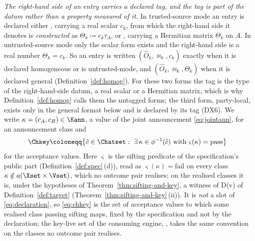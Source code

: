 \begin{definition}
\emph{The right-hand side of an entry carries a declared tag, and the tag is
part of the datum rather than a property measured of it.} In trusted-source
mode an entry is declared either , carrying a real scalar
$c_k$, from which the right-hand side it denotes is \emph{constructed} as
$\Theta_k\coloneqq c_k\tau_A$, or , carrying a Hermitian matrix
$\Theta_k$ on $A$. In untrusted-source mode only the scalar form exists and
the right-hand side is a real number $\Theta_k=c_k$. So an entry is written
$(\hat O_k,\bowtie_k,c_k)$ exactly when it is declared homogeneous or is
untrusted-mode, and $(\hat O_k,\bowtie_k,\Theta_k)$ when it is declared
general (Definition~\ref{def:homog}). For these two forms the tag
is the type of the right-hand-side datum, a real scalar or a Hermitian
matrix, which is why Definition~\ref{def:homog} calls them the untagged
forms; the third form, party-local, exists only in the general format below
and is declared by its tag (DX6). We write $\kappa=(c_A,c_B)\in\Kann$, a
value of the joint announcement \eqref{eq:jointann}, for an announcement
class and
\begin{equation}\label{eq:chkey}
  \Chkey\coloneqq\big\{\hat c\in\Chatset:\ \exists\,\kappa\in\phi^{-1}(\hat c)
  \text{ with }\varsigma(\kappa)=\mathrm{pass}\big\}
\end{equation}
for the
acceptance values. Here $\varsigma$ is the sifting predicate of the
specification's public part (Definition~\ref{def:spec}\,(d)), read as
$\varsigma(\kappa)=\mathrm{fail}$ on every class
$\kappa\notin a(\Xset\times\Vset)$, which no outcome pair realises; on the
realised classes it is, under the hypotheses of
Theorem~\ref{thm:sifting-and-key}, a witness of D(v) of
Definition~\ref{def:target}
(Theorem~\ref{thm:sifting-and-key}\,(ii)). It is \emph{not} a slot of
\eqref{eq:declaration}, so \eqref{eq:chkey} is the set of acceptance values
to which some realised class passing sifting maps, fixed by the
specification and not by the declaration; the key-live set of the consuming
engine, , takes the same convention on the
classes no outcome pair realises.


\end{definition}
